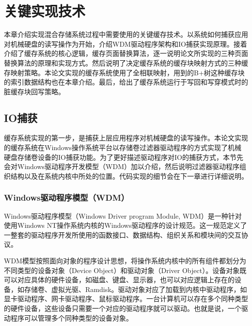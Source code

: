 
\chapter{关键实现技术}
\label{cha:key_tech}

本章介绍实现混合存储系统过程中需要使用的关键缓存技术。以系统如何捕获应用对机械硬盘的读写操作为开始，介绍WDM驱动程序架构和IO捕获实现原理。接着介绍了缓存系统的核心逻辑，缓存页面替换算法，逐一说明论文所实现的三种页面替换算法的原理和实现方式。然后说明了决定缓存系统的缓存块映射方式的三种缓存映射策略。本论文实现的缓存系统使用了全相联映射，用到的B+树这种缓存块的索引数据结构也在本章介绍。最后，给出了缓存系统运行于写回和写穿模式时的脏缓存块回写策略。

\section{IO捕获}
\label{sec:capture_io}

缓存系统实现的第一步，是捕获上层应用程序对机械硬盘的读写操作。本论文实现的缓存系统在Windows操作系统平台以存储卷过滤器驱动程序的方式实现了机械硬盘存储卷设备的IO捕获功能。为了更好描述驱动程序对IO的捕获方式，本节先会对Windows驱动程序开发模型（WDM）加以介绍，然后说明过滤器驱动程序组织结构以及在系统内核中所处的位置。代码实现的细节会在下一章进行详细说明。

\subsection{Windows驱动程序模型（WDM）}
Windows驱动程序模型（Windows Driver program Module, WDM）是一种针对使用Windows NT操作系统内核的Windows驱动程序的设计规范\cite{wdm2001}。这一规范定义了一整套的驱动程序开发所使用的函数接口、数据结构、组织关系和模块间的交互协议。

WDM模型按照面向对象的程序设计思想，将操作系统内核中的所有组件都划分为不同类型的设备对象（Device Object）和驱动对象（Driver Object）。设备对象既可以对应具体的硬件设备，如磁盘、键盘、显示器，也可以对应逻辑上存在的设备，如存储卷、虚拟光驱、Ramdisk。驱动对象对应了加载到内核中驱动程序，如显卡驱动程序、网卡驱动程序、鼠标驱动程序。一台计算机可以存在多个同种类型的硬件设备，这些设备只需要一个对应的驱动程序就可以驱动。也就是说，一个驱动程序可以管理多个同种类型的设备对象。

